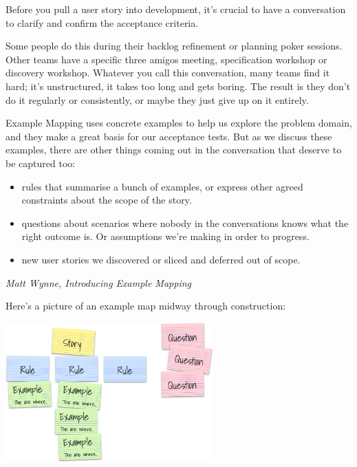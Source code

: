     \begin{framed}
       Before you pull a user story into development, it’s crucial to have a conversation to clarify and confirm the acceptance criteria.

        Some people do this during their backlog refinement or planning poker sessions. Other teams have a specific three amigos meeting, specification workshop or discovery workshop. Whatever you call this conversation, many teams find it hard; it’s unstructured, it takes too long and gets boring. The result is they don’t do it regularly or consistently, or maybe they just give up on it entirely.
        
        Example Mapping uses concrete examples to help us explore the problem domain, and they make a great basis for our acceptance tests. But as we discuss these examples, there are other things coming out in the conversation that deserve to be captured too:
        
        \begin{itemize}
            \item rules that summarise a bunch of examples, or express other agreed constraints about the scope of the story.
            \item questions about scenarios where nobody in the conversations knows what the right outcome is. Or assumptions we're making in order to progress.
            \item new user stories we discovered or sliced and deferred out of scope.
        \end{itemize} 
       
       \begin{flushright}
            \textit{Matt Wynne, Introducing Example Mapping}
        \end{flushright}
    \end{framed}
    
    
    Here's a picture of an example map midway through construction:
    
    \begin{center}
        \includegraphics[width= 0.6\textwidth]{bdd-fundamentals/images/example-map.png} 
    \end{center}

